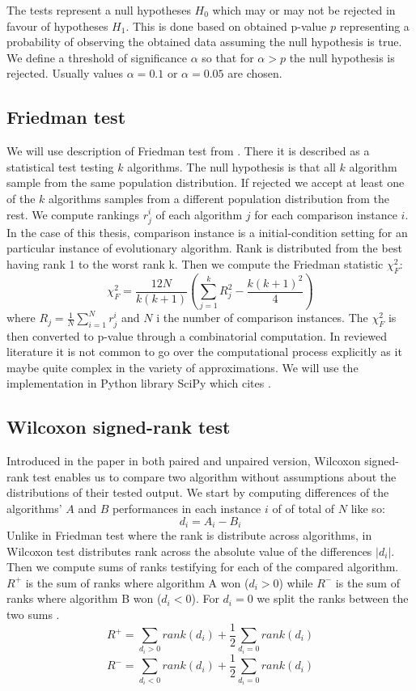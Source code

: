 The tests represent a null hypotheses $ H_0 $ which may or may not be rejected in favour of hypotheses $ H_1 $. This is done based on obtained p-value $ p $ representing a probability of observing the obtained data assuming the null hypothesis is true. We define a threshold of significance $ \alpha $ so that for $ \alpha > p $ the null hypothesis is rejected. Usually values $ 	\alpha = 0.1 $ or $ 	\alpha = 0.05 $ are chosen.\citep{algTesting}
\subsection{Friedman test}
We will use description of Friedman test from \cite{algTesting}. 
There it is described as a statistical test testing $ k $ algorithms. The null hypothesis is that all $ k $ algorithm sample from the same population distribution. If rejected we accept at least one of the $ k $ algorithms samples from a different population distribution from the rest.
We compute rankings $ r_j^i  $ of each algorithm $ j $ for each comparison instance $ i $. In the case of this thesis, comparison instance is a initial-condition setting for an particular instance of evolutionary algorithm. Rank is distributed from the best having rank 1 to the worst rank k. Then we compute the Friedman statistic $ \chi_F^2 $:
\[
\chi_F^2 =
\frac{12N}{k(k+1)}
\left(
\sum_{j=1}^{k} R_j^2
-
\frac{k(k+1)^2}{4}
\right)
\]
where $ R_j = \frac{1}{N}\sum_{i=1}^{N} r_j^i $ and $ N $ i the number of comparison instances. The $ \chi_F^2 $ is then converted to p-value through a combinatorial computation. In reviewed literature it is not common to go over the computational process  explicitly as it maybe quite complex in the variety of approximations. We will use the implementation in Python library SciPy which cites \cite{statistics}. 
\subsection{Wilcoxon signed-rank test}
\label{sec:Wilcoxon}
Introduced in the paper \cite{Wilcoxon1992} in both paired and unpaired version, Wilcoxon signed-rank test enables us to compare two algorithm  without assumptions about the distributions of their tested output.
We start by computing differences of the algorithms' $ A $ and $ B $ performances in each instance $ i $ of of total of $ N $ like so:
\begin{equation}
	 d_i = A_i - B_i \label{eq:WilcoxonDiffs}
\end{equation}
Unlike in Friedman test where the rank is distribute across algorithms, in Wilcoxon test distributes rank across the absolute value of the differences $ |d_i| $.  Then we compute sums of ranks testifying for each of the compared algorithm. $ R^{+} $ is the sum of ranks where algorithm A won ($ d_i > 0 $) while  $ R^{-} $ is the sum of ranks where algorithm B won ($ d_i < 0$). For $ d_i = 0 $ we split the ranks between the two sums \citep{algTesting}.
\[ 
R^{+} = \sum_{d_i > 0} rank(d_i) + \frac{1}{2}\sum_{d_i = 0} rank(d_i)
 \]
\[ 
R^{-} = \sum_{d_i < 0} rank(d_i) + \frac{1}{2}\sum_{d_i = 0} rank(d_i)
\]

